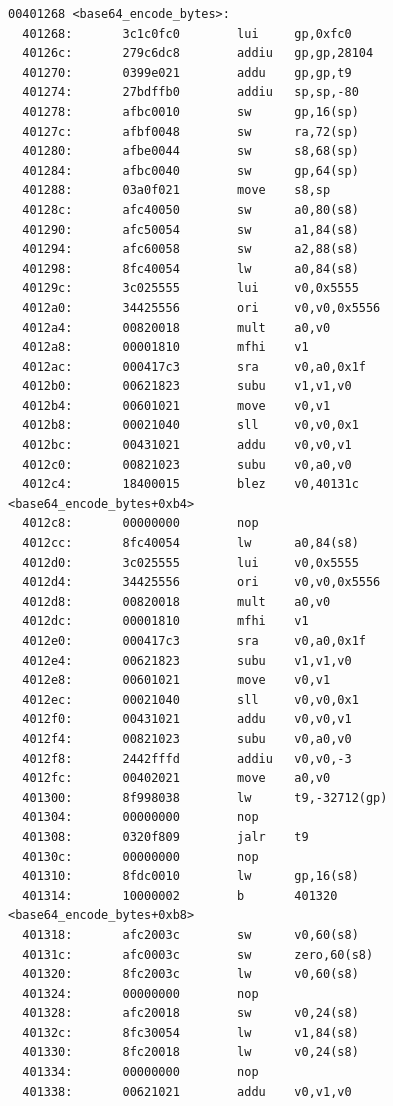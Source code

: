 \documentclass[11pt]{article}
\begin{document}
\begin{verbatim}
00401268 <base64_encode_bytes>:
  401268:       3c1c0fc0        lui     gp,0xfc0
  40126c:       279c6dc8        addiu   gp,gp,28104
  401270:       0399e021        addu    gp,gp,t9
  401274:       27bdffb0        addiu   sp,sp,-80
  401278:       afbc0010        sw      gp,16(sp)
  40127c:       afbf0048        sw      ra,72(sp)
  401280:       afbe0044        sw      s8,68(sp)
  401284:       afbc0040        sw      gp,64(sp)
  401288:       03a0f021        move    s8,sp
  40128c:       afc40050        sw      a0,80(s8)
  401290:       afc50054        sw      a1,84(s8)
  401294:       afc60058        sw      a2,88(s8)
  401298:       8fc40054        lw      a0,84(s8)
  40129c:       3c025555        lui     v0,0x5555
  4012a0:       34425556        ori     v0,v0,0x5556
  4012a4:       00820018        mult    a0,v0
  4012a8:       00001810        mfhi    v1
  4012ac:       000417c3        sra     v0,a0,0x1f
  4012b0:       00621823        subu    v1,v1,v0
  4012b4:       00601021        move    v0,v1
  4012b8:       00021040        sll     v0,v0,0x1
  4012bc:       00431021        addu    v0,v0,v1
  4012c0:       00821023        subu    v0,a0,v0
  4012c4:       18400015        blez    v0,40131c <base64_encode_bytes+0xb4>
  4012c8:       00000000        nop
  4012cc:       8fc40054        lw      a0,84(s8)
  4012d0:       3c025555        lui     v0,0x5555
  4012d4:       34425556        ori     v0,v0,0x5556
  4012d8:       00820018        mult    a0,v0
  4012dc:       00001810        mfhi    v1
  4012e0:       000417c3        sra     v0,a0,0x1f
  4012e4:       00621823        subu    v1,v1,v0
  4012e8:       00601021        move    v0,v1
  4012ec:       00021040        sll     v0,v0,0x1
  4012f0:       00431021        addu    v0,v0,v1
  4012f4:       00821023        subu    v0,a0,v0
  4012f8:       2442fffd        addiu   v0,v0,-3
  4012fc:       00402021        move    a0,v0
  401300:       8f998038        lw      t9,-32712(gp)
  401304:       00000000        nop
  401308:       0320f809        jalr    t9
  40130c:       00000000        nop
  401310:       8fdc0010        lw      gp,16(s8)
  401314:       10000002        b       401320 <base64_encode_bytes+0xb8>
  401318:       afc2003c        sw      v0,60(s8)
  40131c:       afc0003c        sw      zero,60(s8)
  401320:       8fc2003c        lw      v0,60(s8)
  401324:       00000000        nop
  401328:       afc20018        sw      v0,24(s8)
  40132c:       8fc30054        lw      v1,84(s8)
  401330:       8fc20018        lw      v0,24(s8)
  401334:       00000000        nop
  401338:       00621021        addu    v0,v1,v0

\end{verbatim}
\end{document}
